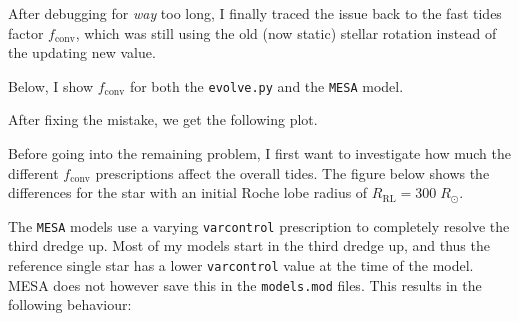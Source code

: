 \documentclass[a4paper,10pt]{article}
\begin{document}
After debugging for \emph{way} too long, I finally traced the issue back to the fast tides factor \(f_\text{conv}\), which was still using the old (now static) stellar rotation instead of the updating new value.

Below, I show \(f_\text{conv}\) for both the \lstinline[style=output, breaklines=true]|evolve.py| and the \lstinline[style=output, breaklines=true]|MESA| model.
\begin{figure}[ht]
    \centering
\end{figure}

After fixing the mistake, we get the following plot.
\begin{figure}[ht]
    \centering
\end{figure}

Before going into the remaining problem, I first want to investigate how much the different \(f_\text{conv}\) prescriptions affect the overall tides. The figure below shows the differences for the star with an initial Roche lobe radius of \(R_\text{RL} = 300\;R_\odot \).
\begin{figure}[ht]
    \centering
\end{figure}

The \citet{rees2024b} \lstinline[style=output, breaklines=true]|MESA| models use a varying \lstinline[style=output, breaklines=true]|varcontrol| prescription to completely resolve the third dredge up. Most of my models start in the third dredge up, and thus the reference single star has a lower \lstinline[style=output, breaklines=true]|varcontrol| value at the time of the model. MESA does not however save this in the \lstinline[style=output, breaklines=true]|models.mod| files. This results in the following behaviour:
\end{document}
